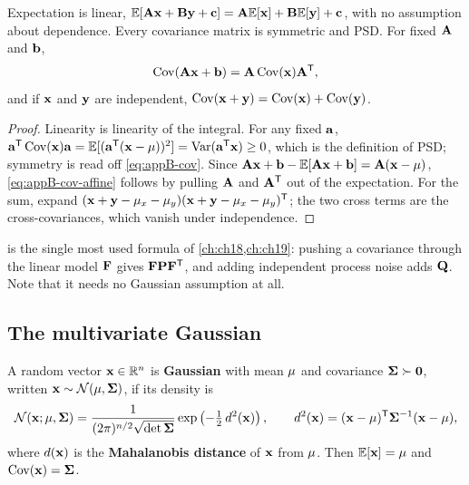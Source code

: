 \begin{proposition}
\label{thm:appB-cov-rules}
Expectation is linear, $\mathbb{E}[\mathbf{A}\mathbf{x} + \mathbf{B}\mathbf{y} + \mathbf{c}] = \mathbf{A}\mathbb{E}[\mathbf{x}] + \mathbf{B}\mathbb{E}[\mathbf{y}] + \mathbf{c}$, with no assumption about dependence. Every covariance matrix is symmetric and PSD. For fixed $\mathbf{A}$ and $\mathbf{b}$,
\begin{equation}
  \operatorname{Cov}(\mathbf{A}\mathbf{x} + \mathbf{b}) = \mathbf{A}\operatorname{Cov}(\mathbf{x})\mathbf{A}^{\mathsf{T}},
  \label{eq:appB-cov-affine}
\end{equation}
and if $\mathbf{x}$ and $\mathbf{y}$ are independent, $\operatorname{Cov}(\mathbf{x} + \mathbf{y}) = \operatorname{Cov}(\mathbf{x}) + \operatorname{Cov}(\mathbf{y})$.
\end{proposition}
\begin{proof}
Linearity is linearity of the integral. For any fixed $\mathbf{a}$, $\mathbf{a}^{\mathsf{T}}\operatorname{Cov}(\mathbf{x})\mathbf{a} = \mathbb{E}[(\mathbf{a}^{\mathsf{T}}(\mathbf{x} - \mathbf{\mu}))^2] = \operatorname{Var}(\mathbf{a}^{\mathsf{T}}\mathbf{x}) \ge 0$, which is the definition of PSD; symmetry is read off \cref{eq:appB-cov}. Since $\mathbf{A}\mathbf{x} + \mathbf{b} - \mathbb{E}[\mathbf{A}\mathbf{x} + \mathbf{b}] = \mathbf{A}(\mathbf{x} - \mathbf{\mu})$, \cref{eq:appB-cov-affine} follows by pulling $\mathbf{A}$ and $\mathbf{A}^{\mathsf{T}}$ out of the expectation. For the sum, expand $(\mathbf{x} + \mathbf{y} - \mathbf{\mu}_x - \mathbf{\mu}_y)(\mathbf{x} + \mathbf{y} - \mathbf{\mu}_x - \mathbf{\mu}_y)^{\mathsf{T}}$; the two cross terms are the cross-covariances, which vanish under independence. \qedhere
\end{proof}

 is the single most used formula of
\cref{ch:ch18,ch:ch19}: pushing a covariance through the linear model
$\mathbf{F}$ gives $\mathbf{F}\mathbf{P}\mathbf{F}^{\mathsf{T}}$, and adding independent process
noise adds $\mathbf{Q}$. Note that it needs no Gaussian assumption at all.

\subsection{The multivariate Gaussian}

\begin{definition}
\label{def:appB-gaussian}
A random vector $\mathbf{x} \in \mathbb{R}^n$ is \textbf{Gaussian} with mean $\mathbf{\mu}$ and covariance $\mathbf{\Sigma} \succ \mathbf{0}$, written $\mathbf{x} \sim \mathcal{N}(\mathbf{\mu}, \mathbf{\Sigma})$, if its density is
\begin{equation}
  \mathcal{N}(\mathbf{x}; \mathbf{\mu}, \mathbf{\Sigma}) = \frac{1}{(2\pi)^{n/2}\sqrt{\det\mathbf{\Sigma}}}\exp\left(-\tfrac12\,d^2(\mathbf{x})\right),\qquad
  d^2(\mathbf{x}) = (\mathbf{x} - \mathbf{\mu})^{\mathsf{T}}\mathbf{\Sigma}^{-1}(\mathbf{x} - \mathbf{\mu}),
  \label{eq:appB-gaussian}
\end{equation}
where $d(\mathbf{x})$ is the \textbf{Mahalanobis distance} of $\mathbf{x}$ from $\mathbf{\mu}$. Then $\mathbb{E}[\mathbf{x}] = \mathbf{\mu}$ and $\operatorname{Cov}(\mathbf{x}) = \mathbf{\Sigma}$.
\end{definition}

